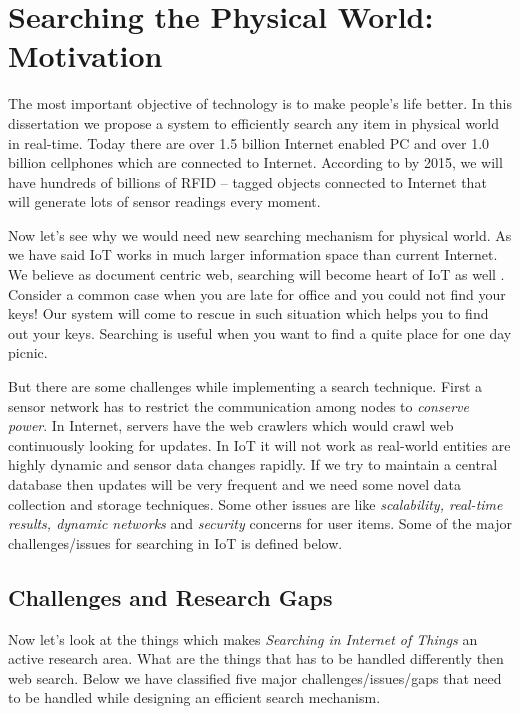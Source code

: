 \documentclass [a4paper,12pt]{book}
\begin{document}
\section{Searching the Physical World: Motivation}

The most important objective of technology is to make people's life better. In this dissertation we propose a system to efficiently search any item in physical world in real-time. Today there are over 1.5 billion Internet enabled PC and over 1.0 billion cellphones which are connected to Internet. According to \cite{7} by 2015, we will have hundreds of billions of RFID – tagged objects connected to Internet that will generate lots of sensor readings every moment.

Now let's see why we would need new searching mechanism for physical world. As we have said IoT works in much larger information space than current Internet. We believe as document centric web, searching will become heart of IoT as well \cite{8}. Consider a common case when you are late for office and you could not find your keys! Our system will come to rescue in such situation which helps you to find out your keys. Searching is useful when you want to find a quite place for one day picnic. 

But there are some challenges while implementing a search technique. First a sensor network has to restrict the communication among nodes to  \emph{conserve power}. In Internet, servers have the web crawlers which would crawl web continuously looking for updates. In IoT it will not work as real-world entities are highly dynamic and sensor data changes rapidly. If we try to maintain a central database then updates will be very frequent and we need some novel data collection and storage techniques. Some other issues are like  \emph{scalability, real-time results, dynamic networks} and  \emph{security} concerns for user items. Some of the major challenges/issues for searching in IoT is defined below.

\subsection{Challenges and Research Gaps}
Now let's look at the things which makes \emph{Searching in Internet of Things} an active research area. What are the things that has to be handled differently then web search. Below we have classified five major challenges/issues/gaps that need to be handled while designing an efficient search mechanism.
\end{document}
